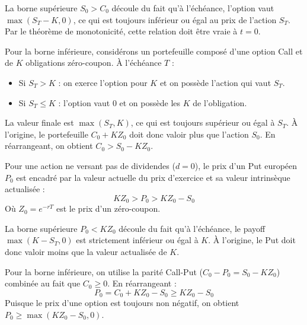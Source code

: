 \begin{proofbox}
La borne supérieure $S_0 > C_0$ découle du fait qu'à l'échéance, l'option vaut $\max(S_T - K, 0)$, ce qui est toujours inférieur ou égal au prix de l'action $S_T$. Par le théorème de monotonicité, cette relation doit être vraie à $t = 0$.

Pour la borne inférieure, considérons un portefeuille composé d'une option Call et de $K$ obligations zéro-coupon. À l'échéance $T$ :
\begin{itemize}[label=$\rightarrow$]
    \item Si $S_T > K$ : on exerce l'option pour $K$ et on possède l'action qui vaut $S_T$.
    \item Si $S_T \leq K$ : l'option vaut $0$ et on possède les $K$ de l'obligation.
\end{itemize}
La valeur finale est $\max(S_T, K)$, ce qui est toujours supérieur ou égal à $S_T$. À l'origine, le portefeuille $C_0 + K Z_0$ doit donc valoir plus que l'action $S_0$. En réarrangeant, on obtient $C_0 > S_0 - K Z_0$.
\end{proofbox}

\begin{theorembox}
Pour une action ne versant pas de dividendes ($d = 0$), le prix d'un Put européen $P_0$ est encadré par la valeur actuelle du prix d'exercice et sa valeur intrinsèque actualisée :
\begin{equation}
    \label{eq:fsec2-bornes_put}
    K Z_0 > P_0 > K Z_0 - S_0
\end{equation}
Où $Z_0 = e^{-rT}$ est le prix d'un zéro-coupon.
\end{theorembox}

\begin{proofbox}
La borne supérieure $P_0 < K Z_0$ découle du fait qu'à l'échéance, le payoff $\max(K - S_T, 0)$ est strictement inférieur ou égal à $K$. À l'origine, le Put doit donc valoir moins que la valeur actualisée de $K$.

Pour la borne inférieure, on utilise la parité Call-Put ($C_0 - P_0 = S_0 - K Z_0$) combinée au fait que $C_0 \ge 0$. En réarrangeant :
\begin{equation}
    \label{eq:fsec2-bornes_put_proof}
    P_0 = C_0 + K Z_0 - S_0 \ge K Z_0 - S_0
\end{equation}
Puisque le prix d'une option est toujours non négatif, on obtient $P_0 \ge \max(K Z_0 - S_0, 0)$.
\end{proofbox}


